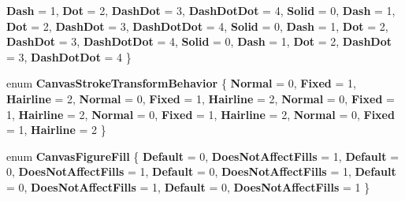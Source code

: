 \begin{DoxyCompactItemize}
{\bfseries Dash} = 1, 
{\bfseries Dot} = 2, 
\newline
{\bfseries Dash\+Dot} = 3, 
{\bfseries Dash\+Dot\+Dot} = 4, 
{\bfseries Solid} = 0, 
{\bfseries Dash} = 1, 
\newline
{\bfseries Dot} = 2, 
{\bfseries Dash\+Dot} = 3, 
{\bfseries Dash\+Dot\+Dot} = 4, 
{\bfseries Solid} = 0, 
\newline
{\bfseries Dash} = 1, 
{\bfseries Dot} = 2, 
{\bfseries Dash\+Dot} = 3, 
{\bfseries Dash\+Dot\+Dot} = 4, 
\newline
{\bfseries Solid} = 0, 
{\bfseries Dash} = 1, 
{\bfseries Dot} = 2, 
{\bfseries Dash\+Dot} = 3, 
\newline
{\bfseries Dash\+Dot\+Dot} = 4
 \}
\item 
\mbox{\label{namespace_microsoft_1_1_graphics_1_1_canvas_1_1_geometry_a79c0c14002e1ebbc20c430497d584867}} 
enum {\bfseries Canvas\+Stroke\+Transform\+Behavior} \{ \newline
{\bfseries Normal} = 0, 
{\bfseries Fixed} = 1, 
{\bfseries Hairline} = 2, 
{\bfseries Normal} = 0, 
\newline
{\bfseries Fixed} = 1, 
{\bfseries Hairline} = 2, 
{\bfseries Normal} = 0, 
{\bfseries Fixed} = 1, 
\newline
{\bfseries Hairline} = 2, 
{\bfseries Normal} = 0, 
{\bfseries Fixed} = 1, 
{\bfseries Hairline} = 2, 
\newline
{\bfseries Normal} = 0, 
{\bfseries Fixed} = 1, 
{\bfseries Hairline} = 2
 \}
\item 
\mbox{\label{namespace_microsoft_1_1_graphics_1_1_canvas_1_1_geometry_aff867f5434d5804c2b0bcc7ada82e275}} 
enum {\bfseries Canvas\+Figure\+Fill} \{ \newline
{\bfseries Default} = 0, 
{\bfseries Does\+Not\+Affect\+Fills} = 1, 
{\bfseries Default} = 0, 
{\bfseries Does\+Not\+Affect\+Fills} = 1, 
\newline
{\bfseries Default} = 0, 
{\bfseries Does\+Not\+Affect\+Fills} = 1, 
{\bfseries Default} = 0, 
{\bfseries Does\+Not\+Affect\+Fills} = 1, 
\newline
{\bfseries Default} = 0, 
{\bfseries Does\+Not\+Affect\+Fills} = 1
 \}
\item 
\mbox{\label{namespace_microsoft_1_1_graphics_1_1_canvas_1_1_geometry_ac9b0f6a16960b87589d16512e46f64c1}} 

\end{DoxyCompactItemize}
